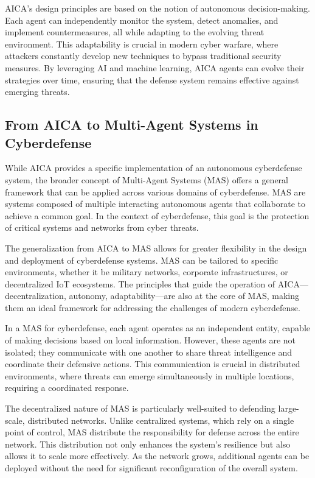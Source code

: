 AICA's design principles are based on the notion of autonomous decision-making. Each agent can independently monitor the system, detect anomalies, and implement countermeasures, all while adapting to the evolving threat environment. This adaptability is crucial in modern cyber warfare, where attackers constantly develop new techniques to bypass traditional security measures. By leveraging AI and machine learning, AICA agents can evolve their strategies over time, ensuring that the defense system remains effective against emerging threats.

\subsection{From AICA to Multi-Agent Systems in Cyberdefense}

While AICA provides a specific implementation of an autonomous cyberdefense system, the broader concept of Multi-Agent Systems (MAS) offers a general framework that can be applied across various domains of cyberdefense. MAS are systems composed of multiple interacting autonomous agents that collaborate to achieve a common goal. In the context of cyberdefense, this goal is the protection of critical systems and networks from cyber threats.

The generalization from AICA to MAS allows for greater flexibility in the design and deployment of cyberdefense systems. MAS can be tailored to specific environments, whether it be military networks, corporate infrastructures, or decentralized IoT ecosystems. The principles that guide the operation of AICA—decentralization, autonomy, adaptability—are also at the core of MAS, making them an ideal framework for addressing the challenges of modern cyberdefense.

In a MAS for cyberdefense, each agent operates as an independent entity, capable of making decisions based on local information. However, these agents are not isolated; they communicate with one another to share threat intelligence and coordinate their defensive actions. This communication is crucial in distributed environments, where threats can emerge simultaneously in multiple locations, requiring a coordinated response.

The decentralized nature of MAS is particularly well-suited to defending large-scale, distributed networks. Unlike centralized systems, which rely on a single point of control, MAS distribute the responsibility for defense across the entire network. This distribution not only enhances the system's resilience but also allows it to scale more effectively. As the network grows, additional agents can be deployed without the need for significant reconfiguration of the overall system.

